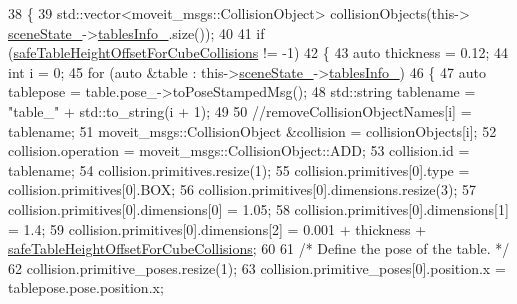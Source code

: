 \begin{DoxyCode}
38         \{
39             std::vector<moveit\_msgs::CollisionObject> collisionObjects(this->
      \hyperlink{classsm__fetch__six__table__pick__n__sort__1_1_1move__group__interface__client_1_1CpConstraintTableWorkspaces_ab2dff81f5735a98cffd13a4141d79e33}{sceneState\_}->\hyperlink{classsm__fetch__six__table__pick__n__sort__1_1_1cl__perception__system_1_1CpSceneState_a2de6a25cdfe869099984fbf8225874cd}{tablesInfo\_}.size());
40 
41             \textcolor{keywordflow}{if} (\hyperlink{classsm__fetch__six__table__pick__n__sort__1_1_1move__group__interface__client_1_1CpConstraintTableWorkspaces_a3fb4f4deb8a694ff797af6336e74444e}{safeTableHeightOffsetForCubeCollisions} != -1)
42             \{
43                 \textcolor{keyword}{auto} thickness = 0.12;
44                 \textcolor{keywordtype}{int} i = 0;
45                 \textcolor{keywordflow}{for} (\textcolor{keyword}{auto} &table : this->\hyperlink{classsm__fetch__six__table__pick__n__sort__1_1_1move__group__interface__client_1_1CpConstraintTableWorkspaces_ab2dff81f5735a98cffd13a4141d79e33}{sceneState\_}->\hyperlink{classsm__fetch__six__table__pick__n__sort__1_1_1cl__perception__system_1_1CpSceneState_a2de6a25cdfe869099984fbf8225874cd}{tablesInfo\_})
46                 \{
47                     \textcolor{keyword}{auto} tablepose = table.pose\_->toPoseStampedMsg();
48                     std::string tablename = \textcolor{stringliteral}{"table\_"} + std::to\_string(i + 1);
49 
50                     \textcolor{comment}{//removeCollisionObjectNames[i] = tablename;}
51                     moveit\_msgs::CollisionObject &collision = collisionObjects[i];
52                     collision.operation = moveit\_msgs::CollisionObject::ADD;
53                     collision.id = tablename;
54                     collision.primitives.resize(1);
55                     collision.primitives[0].type = collision.primitives[0].BOX;
56                     collision.primitives[0].dimensions.resize(3);
57                     collision.primitives[0].dimensions[0] = 1.05;
58                     collision.primitives[0].dimensions[1] = 1.4;
59                     collision.primitives[0].dimensions[2] = 0.001 + thickness + 
      \hyperlink{classsm__fetch__six__table__pick__n__sort__1_1_1move__group__interface__client_1_1CpConstraintTableWorkspaces_a3fb4f4deb8a694ff797af6336e74444e}{safeTableHeightOffsetForCubeCollisions};
60 
61                     \textcolor{comment}{/* Define the pose of the table. */}
62                     collision.primitive\_poses.resize(1);
63                     collision.primitive\_poses[0].position.x = tablepose.pose.position.x;

\end{DoxyCode}
